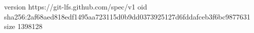 version https://git-lfs.github.com/spec/v1
oid sha256:2af68aed818edf1495aa723115d0b9dd0373925127d6fddafceb3f6bc9877631
size 1398128
